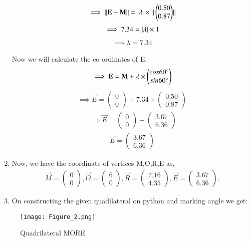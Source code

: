 \documentclass[journal,12pt,twocolumn]{IEEEtran}
\newcommand{\myvec}[1]{\ensuremath{\begin{pmatrix}#1\end{pmatrix}}}
\begin{document}
\begin{enumerate}
\begin{align}
    \implies {\norm{\vec{E}-\vec{M}}}= \abs{\lambda} \times{\norm{\myvec{0.50\\0.87}}}
\end{align}
\begin{align}
   \implies 7.34= \vert\lambda\vert \times 1
\end{align}
\begin{align}
    \implies \lambda = 7.34
\end{align}
\begin{lemma}
 Now we will calculate the co-ordinates of E,
\begin{align}
 \implies \vec{E}= \vec{M}+ \lambda \times \myvec{cos60\degree\\sin60\degree}
 \end{align}
 \begin{align}
     \implies \vec{E}= \myvec{0\\0}+7.34 \times \myvec{0.50\\0.87}
 \end{align}
 \begin{align}
     \implies \vec{E}= \myvec{0\\0}+\myvec{3.67\\6.36}
 \end{align}
 \begin{align}
     \vec{E}= \myvec{3.67\\6.36}
 \end{align}
 \end{lemma}
 \item Now, we have the coordinate of vertices M,O,R,E as,
\begin{align}
\vec{M}= \myvec{0 \\ 0}, \vec{O}= \myvec{6 \\ 0},  \vec{R}= \myvec{7.16 \\ 4.35}, \vec{E}= \myvec{3.67 \\ 6.36}.
\end{align}    
    \item On constructing the given quadilateral on python and marking angle we get:
\end{enumerate}
\begin{figure}[!ht]
\texttt{[image: Figure\_2.png]}
\caption{Quadrilateral MORE}
\label{fig:Quadrilateral MORE}	
\end{figure}
\end{document}
